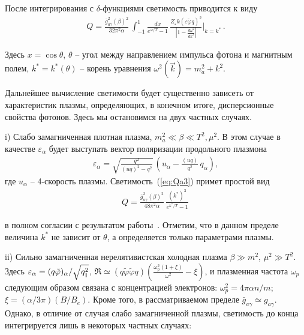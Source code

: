 После интегрирования с $\delta$-функциями светимость приводится к виду
%
\begin{eqnarray}
Q =  \frac{\bar g_{a\gamma}^2 (\beta)^2}{32 \pi^2 \alpha} \, 
\int_{-1}^1 \frac{dx}{e^{\omega/T}-1} \, 
\frac{Z_{\varepsilon} k 
(\varepsilon \tilde \varphi q)^2}{\left |1-\frac{d\omega^2}{dk^2}\right |}\bigg |_{k=k^*}\, .
\label{eq:Qa3}
\end{eqnarray}
%

\noindent Здесь $x = \cos{\theta}$, $\theta$ --  угол 
между направлением импульса фотона и магнитным полем, $k^* = k^*(\theta)$ --  
 корень уравнения $\omega^2 (\vec k) = m_a^2+k^2$. 


Дальнейшее вычисление светимости будет существенно зависеть от характеристик плазмы, 
определяющих, в конечном итоге, дисперсионные свойства фотонов. Здесь мы остановимся 
на двух частных случаях.

i) Слабо замагниченная плотная плазма,  $m_a^2 \ll \beta \ll T^2 , \mu^2$. В этом 
случае в качестве $\varepsilon_\alpha$ будет выступать вектор поляризации продольного 
плазмона
%
\begin{eqnarray}
\varepsilon_\alpha = \sqrt{\frac{q^2}{(uq)^2-q^2}}\, 
\left (u_\alpha - \frac{(uq)}{q^2}\, q_\alpha \right ) , 
\end{eqnarray}
%
где $u_\alpha$ -- 4-скорость плазмы. Светимость~(\ref{eq:Qa3}) примет простой вид
%
\begin{eqnarray}
Q =  \frac{\bar g_{a\gamma}^2 (\beta)^2}{48 \pi^2 \alpha} \, 
 \frac{(k^*)^3}{e^{k^*/T}-1} \, 
\label{eq:Qa4}
\end{eqnarray}
%

\noindent 
в полном согласии с результатом работы~\cite{MRV:1998}. Отметим, что в данном пределе 
 величина $k^*$ не зависит от $\theta$, а определяется только параметрами плазмы.


ii) Сильно замагниченная нерелятивистская холодная плазма  $\beta \gg m^2$, $\mu^2 \gg T^2$. Здесь %
$\varepsilon_\alpha = 
(q \tilde \varphi)_\alpha/\sqrt{q^2_{\mbox{\tiny $\|$}}}$, 
$\Re \simeq (q \tilde \varphi \tilde \varphi q) \left (\frac{\omega_p^2(1+\xi)}{\omega^2} -
\xi \right )$, и плазменная частота $\omega_p$   
следующим образом связана с концентрацией электронов:  $\omega^2_p = 4\pi \alpha n/m$; $\xi = (\alpha/3\pi)(B/B_e)$. 
Кроме того, в рассматриваемом пределе 
$\bar g_{a\gamma} \simeq g_{a\gamma}$. Однако,  
в отличие от случая слабо замагниченной плазмы, светимость до конца интегрируется
лишь в некоторых частных случаях:

